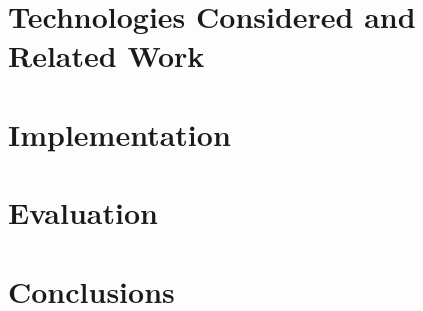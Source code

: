 \documentclass[twocolumn]{article}
\begin{document}
\section{Technologies Considered and Related Work}

\section{Implementation}

\section{Evaluation}

\section{Conclusions}



\end{document}
